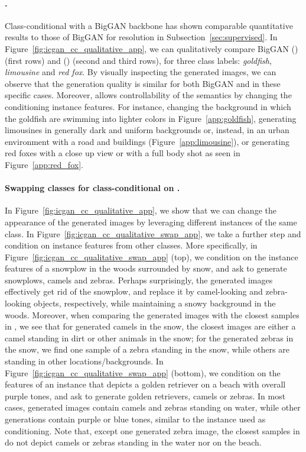 \paragraph{\ImNet.} Class-conditional \ours with a BigGAN backbone has shown comparable quantitative results to those of BigGAN for  resolution in Subsection~\ref{sec:supervised}. In Figure~\ref{fig:icgan_cc_qualitative_app}, we can qualitatively compare BigGAN () (first rows) and \ours () (second and third rows), for three class labels: \textit{goldfish}, \textit{limousine} and \textit{red fox}. By visually inspecting the generated images, we can observe that the generation quality is similar for both BigGAN and \ours in these specific cases. Moreover, \ours allows controllability of the semantics by changing the conditioning instance features. For instance, changing the background in which the goldfish are swimming into lighter colors in Figure~\ref{app:goldfish}, generating limousines in generally dark and uniform backgrounds or, instead, in an urban environment with a road and buildings (Figure~\ref{app:limousine}), or generating red foxes with a close up view or with a full body shot as seen in Figure~\ref{app:red_fox}.

\paragraph{Swapping classes for class-conditional \ours on \ImNet.} 
In Figure~\ref{fig:icgan_cc_qualitative_app}, we show that we can change the appearance of the generated images by leveraging different instances of the same class.
In Figure~\ref{fig:icgan_cc_qualitative_swap_app}, we take a further step and condition on instance features from other classes. More specifically, in Figure~\ref{fig:icgan_cc_qualitative_swap_app} (top), we condition on the instance features of a snowplow in the woods surrounded by snow, and ask to generate snowplows, camels and zebras. Perhaps surprisingly, the generated images effectively get rid of the snowplow, and replace it by camel-looking and zebra-looking objects, respectively, while maintaining a snowy background in the woods. 
Moreover, when comparing the generated images with the closest samples in \ImNet, we see that for generated camels in the snow, the closest images are either a camel standing in dirt or other animals in the snow; for the generated zebras in the snow, we find one sample of a zebra standing in the snow, while others are standing in other locations/backgrounds. 
In Figure~\ref{fig:icgan_cc_qualitative_swap_app} (bottom), we condition on the features of an instance that depicts a golden retriever on a beach with overall purple tones, and ask to generate golden retrievers, camels or zebras. In most cases, generated images contain camels and zebras standing on water, while other generations contain purple or blue tones, similar to the instance used as conditioning. Note that, except one generated zebra image, the closest samples in \ImNet do not depict camels or zebras standing in the water nor on the beach.




